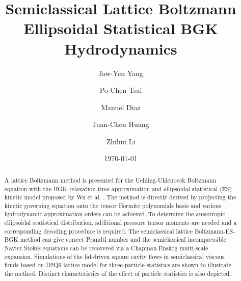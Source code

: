 \documentclass[aip,jmp,amsmath,amssymb,reprint,noshowpacs]{revtex4-1}
\begin{document}
\author{Jaw-Yen Yang}
\author{Po-Chen Tsai}
\author{Manuel Diaz}
\author{Juan-Chen Huang}
\author{Zhihui Li}

\title{Semiclassical Lattice Boltzmann Ellipsoidal Statistical BGK Hydrodynamics}
\date{\today}
	

\begin{abstract}
A lattice Boltzmann method is presented for the Uehling-Uhlenbeck Boltzmann equation with the BGK relaxation time approximation and ellipsoidal statistical (ES) kinetic model proposed by Wu et al. \cite{Wu2012}. The method is directly derived by projecting the kinetic governing equation onto the tensor Hermite polynomials basis and various hydrodynamic approximation orders can be achieved.  To determine the anisotropic ellipsoidal statistical distribution, additional pressure tensor moments are needed and a corresponding decoding procedure is required.  The semiclassical lattice Boltzmann-ES-BGK method can give correct Prandtl number and the semiclassical incompressible Navier-Stokes equations can be recovered via a Chapman-Enskog multi-scale expansion.  Simulations of the lid-driven square cavity flows in semiclassical viscous fluids based on D2Q9 lattice model for three particle statistics are shown to illustrate the method.  Distinct characteristics of the effect of particle statistics is also depicted.
\end{abstract}

\maketitle
\end{document}
